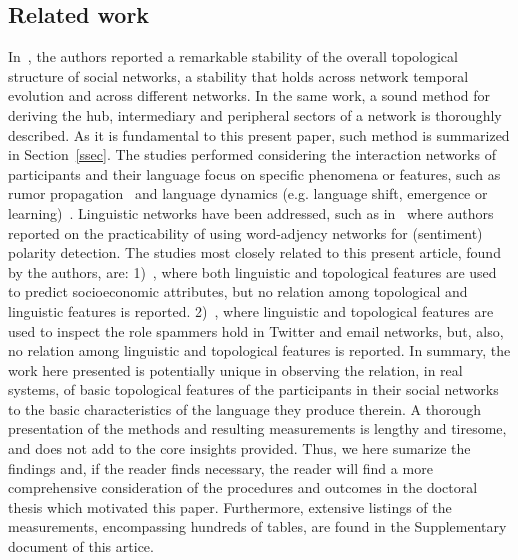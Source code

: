 \documentclass[review]{elsarticle}
\begin{document}
\subsection{Related work}
In~\cite{stab}, the authors reported a remarkable stability of the
overall topological structure of social networks,
a stability that holds across network temporal evolution and across different networks.
In the same work, a sound method for deriving the hub, intermediary and peripheral sectors of a network is thoroughly described.
As it is fundamental to this present paper, such method is summarized in Section~\ref{ssec}.
The studies performed considering the interaction networks of participants and their language focus on specific phenomena or features,
such as rumor propagation~\cite{r1,r2,r3,r4} and language dynamics (e.g. language shift, emergence or learning)~\cite{s1,s2,s3,s4,s5,s6,s7,s8,s9}.
Linguistic networks have been addressed, such as in~\cite{diego} where authors reported on the
practicability of using word-adjency networks for (sentiment) polarity detection.
The studies most closely related to this present article, found by the authors, are:
1)~\cite{ex1}, where both linguistic and topological features are used to predict socioeconomic attributes,
but no relation among topological and linguistic features is reported.
2)~\cite{ex2}, where linguistic and topological features are used to inspect the role spammers hold
in Twitter and email networks, but, also, no relation among linguistic and topological features is reported.
In summary, the work here presented is potentially unique in observing
the relation, in real systems, of basic topological features of the participants
in their social networks to the basic characteristics of the language they produce therein.
A thorough presentation of the methods and resulting measurements 
is lengthy and tiresome, and does not add to the core insights provided.
Thus, we here sumarize the findings and, if the reader finds necessary,
the reader will find a more comprehensive consideration of the procedures
and outcomes in the doctoral thesis which motivated this paper.
Furthermore, extensive listings of the measurements, encompassing hundreds of tables, are found in the Supplementary document of this artice.


\end{document}
